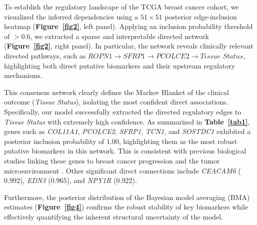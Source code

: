 \documentclass[twoside]{article}
\begin{document}
To establish the regulatory landscape of the TCGA breast cancer cohort, we visualized the inferred dependencies using a $51 \times 51$ posterior edge-inclusion heatmap (\textbf{Figure~\ref{fig2}}, left panel). Applying an inclusion probability threshold of $>0.6$, we extracted a sparse and interpretable directed network (\textbf{Figure~\ref{fig2}}, right panel). In particular, the network reveals clinically relevant directed pathways, such as $\textit{ROPN1} \rightarrow \textit{SFRP1} \rightarrow \textit{PCOLCE2} \rightarrow \textit{Tissue Status}$, highlighting both direct putative biomarkers and their upstream regulatory mechanisms.

This consensus network clearly defines the Markov Blanket of the clinical outcome (\textit{Tissue Status}), isolating the most confident direct associations. Specifically, our model successfully extracted the directed regulatory edges to \textit{Tissue Status} with extremely high confidence. As summarized in \textbf{Table~\ref{tab1}}, genes such as \textit{COL11A1}, \textit{PCOLCE2}, \textit{SFRP1}, \textit{TCN1}, and \textit{SOSTDC1} exhibited a posterior inclusion probability of $1.00$, highlighting them as the most robust putative biomarkers in this network. This is consistent with previous biological studies linking these genes to breast cancer progression and the tumor microenvironment \citep{WW25, Veeck06, Poola05}. Other significant direct connections include \textit{CEACAM6} ($0.992$), \textit{EDN3} ($0.965$), and \textit{NPY1R} ($0.922$).

Furthermore, the posterior distribution of the Bayesian model averaging (BMA) estimates (\textbf{Figure~\ref{fig4}}) confirms the robust stability of key biomarkers while effectively quantifying the inherent structural uncertainty of the model.
\end{document}
